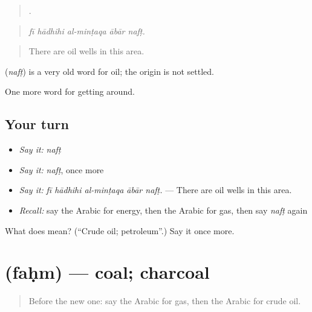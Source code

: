 \begin{quote}
    .
\end{quote}

\begin{quote}
\emph{fī hādhihi al-minṭaqa ābār nafṭ.}
\end{quote}

\begin{quote}
There are oil wells in this area.
\end{quote}

\begin{cousinweb}
\textbf{} (\emph{nafṭ}) is a very old word for oil; the origin is not settled.
\end{cousinweb}

\begin{grammarlens}[title={What you've built}]
One more word for getting around.
\end{grammarlens}

\subsection*{Your turn}
\begin{itemize}
\raggedright
  \item \emph{Say it:} \emph{nafṭ}
  \item \emph{Say it:} \emph{nafṭ}, once more
  \item \emph{Say it:} \emph{fī hādhihi al-minṭaqa ābār nafṭ.} — There are oil wells in this area.
  \item \emph{Recall:} say the Arabic for energy, then the Arabic for gas, then say \emph{nafṭ} again
\end{itemize}

\begin{tcolorbox}[breakable,colback=teal!4,colframe=teal!35!black,title={Before you move on}]
What does  mean? (\textquotedblleft{}Crude oil; petroleum\textquotedblright{}.) Say it once more.
\end{tcolorbox}
\section[\texorpdfstring{\ar{فحم} (faḥm)}{فحم (faḥm)}]{ (faḥm) — coal; charcoal}

\label{lesson:AR-C465-fahm}



\begin{quote}
Before the new one: say the Arabic for gas, then the Arabic for crude oil.
\end{quote}

